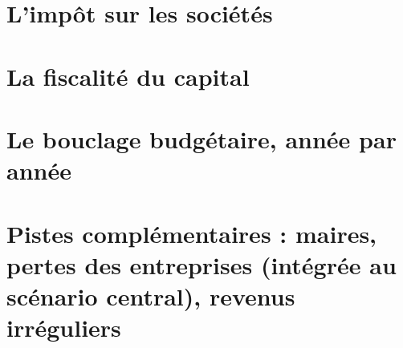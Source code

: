 \documentclass[10pt,a4paper]{article}
\begin{document}
\section{L'impôt sur les sociétés}\label{ann:is}


\section{La fiscalité du capital}\label{ann:pfu}


\section{Le bouclage budgétaire, année par année}\label{ann:bouclage}


\section{Pistes complémentaires : maires, pertes des entreprises (intégrée au scénario central), revenus irréguliers}\label{ann:pal}

\end{document}
